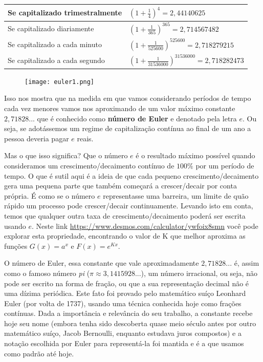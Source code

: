 \begin{knowledge} {}
\begin{center}
	\begin{tabular}{|l|l|}
		\hline
		Se capitalizado trimestralmente & $\left(1+\frac 14 \right)^4=2{,}44140625$                     \\ \hline
		Se capitalizado diariamente     & $\left(1+\frac 1{365} \right)^{365}=2{,}714567482$           \\ \hline
		Se capitalizado a cada minuto   & $\left(1+\frac 1{525600} \right)^{525600}=2{,}718279215$     \\ \hline
		Se capitalizado a cada segundo  & $\left(1+\frac 1{31536000} \right)^{31536000}=2{,}718282473$ \\ \hline
	\end{tabular}
\end{center}

\begin{figure}[H]
\centering
\texttt{[image: euler1.png]}
\end{figure}

Isso nos mostra que na medida em que vamos considerando períodos de tempo cada vez menores vamos nos aproximando de um valor máximo constante $2,71828...$ que é conhecido como \textbf{número de Euler} e denotado pela letra $ e $. Ou seja, se adotássemos um regime de capitalização contínua ao final de um ano a pessoa deveria pagar $e$ reais.

Mas o que isso significa? Que o número $e$ é o resultado máximo possível quando consideramos um crescimento/decaimento contínuo de $100\%$ por um período de tempo. O que é sutil aqui é a ideia de que cada pequeno crescimento/decaimento gera uma pequena parte que também começará a crescer/decair por conta própria. É como se o número $e$ representasse uma barreira, um limite de quão rápido um processo pode crescer/decair continuamente. Levando isto em conta, temos que qualquer outra taxa de crescimento/decaimento poderá ser escrita usando $e$. Neste link \url{https://www.desmos.com/calculator/ywfoix8smn} você pode explorar esta propriedade, encontrando o valor de K que melhor aproxima as funções $G(x)=a^{x}$ e $F(x)=e^{Kx}$.

O número de Euler, essa constante que vale aproximadamente $2{,}71828...$ é, assim como o famoso número \textit{pi} ($\pi \approx 3{,}1415928...$), um número irracional, ou seja, não pode ser escrito na forma de fração, ou que a sua representação decimal não é uma dízima periódica. Este fato foi provado pelo matemático suíço Leonhard Euler (por volta de 1737), usando uma técnica conhecida hoje como frações contínuas. Dada a importância e relevância do seu trabalho, a constante recebe hoje seu nome (embora tenha sido descoberta quase meio século antes por outro matemático suíço, Jacob Bernoulli, enquanto estudava juros compostos) e a notação escolhida por Euler para representá-la foi mantida e é a que usamos como padrão até hoje.


\end{knowledge}
